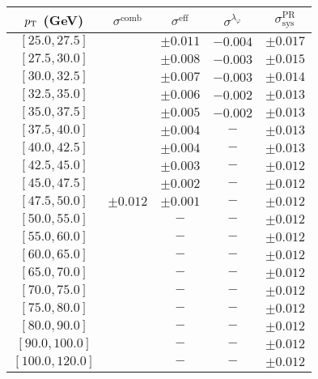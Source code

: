 \begin{tabular}{c||c|c|c||c}
$p_\text{T}$ (GeV) & $\sigma^{\text{comb}}$ & $\sigma^{\text{eff}}$ & $\sigma^{\lambda_\varphi}$ & $\sigma_{\text{sys}}^{\text{PR}}$  \\
\hline
$[25.0, 27.5]$ & \multirow{19}{*}{$\pm0.012$} & $\pm0.011$ & $-0.004$ & $\pm0.017$\\
$[27.5, 30.0]$ &  & $\pm0.008$ & $-0.003$ & $\pm0.015$\\
$[30.0, 32.5]$ &  & $\pm0.007$ & $-0.003$ & $\pm0.014$\\
$[32.5, 35.0]$ &  & $\pm0.006$ & $-0.002$ & $\pm0.013$\\
$[35.0, 37.5]$ &  & $\pm0.005$ & $-0.002$ & $\pm0.013$\\
$[37.5, 40.0]$ &  & $\pm0.004$ & $-$ & $\pm0.013$\\
$[40.0, 42.5]$ &  & $\pm0.004$ & $-$ & $\pm0.013$\\
$[42.5, 45.0]$ &  & $\pm0.003$ & $-$ & $\pm0.012$\\
$[45.0, 47.5]$ &  & $\pm0.002$ & $-$ & $\pm0.012$\\
$[47.5, 50.0]$ &  & $\pm0.001$ & $-$ & $\pm0.012$\\
$[50.0, 55.0]$ &  & $-$ & $-$ & $\pm0.012$\\
$[55.0, 60.0]$ &  & $-$ & $-$ & $\pm0.012$\\
$[60.0, 65.0]$ &  & $-$ & $-$ & $\pm0.012$\\
$[65.0, 70.0]$ &  & $-$ & $-$ & $\pm0.012$\\
$[70.0, 75.0]$ &  & $-$ & $-$ & $\pm0.012$\\
$[75.0, 80.0]$ &  & $-$ & $-$ & $\pm0.012$\\
$[80.0, 90.0]$ &  & $-$ & $-$ & $\pm0.012$\\
$[90.0, 100.0]$ &  & $-$ & $-$ & $\pm0.012$\\
$[100.0, 120.0]$ &  & $-$ & $-$ & $\pm0.012$\\
\end{tabular}
